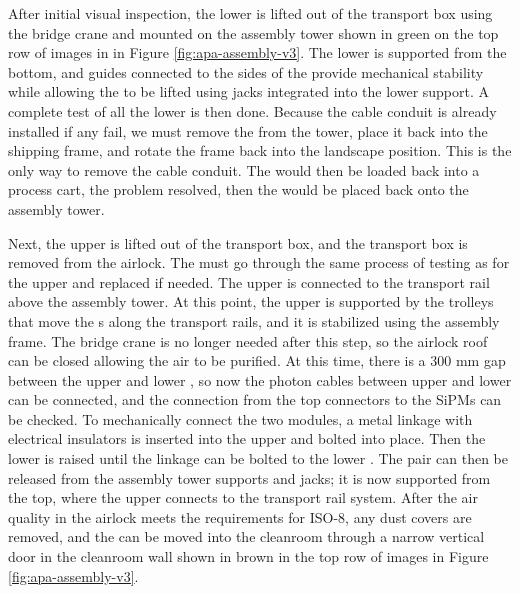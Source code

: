 After initial visual inspection, the lower  is lifted out of the transport box 
using the bridge crane and mounted on the  assembly tower shown in green on the top row of images in in Figure \ref{fig:apa-assembly-v3}. 
The  lower  is supported from the bottom, and guides connected to the sides of the  provide mechanical stability while allowing the  to be lifted using jacks integrated into the lower support. A complete test of all the lower   is then done.  Because the cable conduit is already installed if any  fail, we must remove the  from the tower, place it back into the shipping frame, and rotate the frame back into the landscape position.  This is the only way to remove the cable conduit. The  would then be loaded back into a process cart, the problem resolved, then the  would be placed back onto the assembly tower. 

Next, the upper  is lifted out of the transport box, and the transport box is removed from the airlock. The  must go through the same process of testing as for the upper  and replaced if needed. The upper  is connected to the transport rail above the  assembly tower. At this point, the upper  is supported by the trolleys that move the s along the transport rails, and it is stabilized using the  assembly frame. 
The bridge crane is no longer needed after this step, so the airlock roof can be closed allowing the air to be purified. At this time, there is a 300 \si{mm} gap between the upper and lower , so now the photon cables between upper and lower  can be connected, and the connection from the top connectors to the SiPMs can be checked. 
To mechanically connect the two  modules, a metal linkage with electrical insulators is inserted into the upper  and bolted into place. Then the lower  is raised until the linkage can be bolted to the lower .  
The  pair can then be released from the assembly tower supports and jacks; it is now supported from the top, where the upper  connects to the transport rail system.
After the air quality in the airlock meets the requirements for ISO-8, any dust covers are removed, and the  can be moved into the cleanroom through a narrow vertical door in the cleanroom wall shown in brown in the top row of images in Figure \ref{fig:apa-assembly-v3}.



